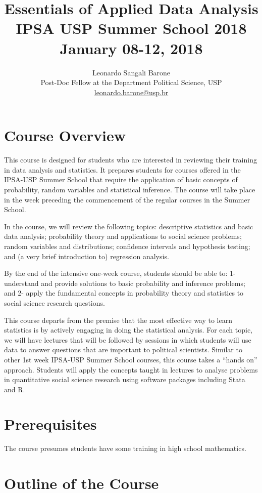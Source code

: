 \documentclass[a4paper,11pt]{article}
\title{Essentials of Applied Data Analysis\\ \large  IPSA USP Summer School 2018\\ January 08-12, 2018}
\author{Leonardo Sangali Barone\\Post-Doc Fellow at the Department Political Science, USP\\ \href{mailto:leonardo.barone@usp.br}{leonardo.barone@usp.br}}
\date{}
\begin{document}
  \maketitle 
    \tableofcontents
  \pagebreak


\section{Course Overview}

This course is designed for students who are interested in reviewing their training in data analysis and statistics. It prepares students for courses offered in the IPSA-USP Summer School that require the application of basic concepts of probability, random variables and statistical inference. The course will take place in the week preceding the commencement of the regular courses in the Summer School.

In the course, we will review the following topics: descriptive statistics and basic data analysis; probability theory and applications to social science problems; random variables and distributions; confidence intervals and hypothesis testing; and (a very brief introduction to) regression analysis.

By the end of the intensive one-week course, students should be able to: 1- understand and provide solutions to basic probability and inference problems; and 2- apply the fundamental concepts in probability theory and statistics to social science research questions.

This course departs from the premise that the most effective way to learn statistics is by actively engaging in doing the statistical analysis. For each topic, we will have lectures that will be followed by sessions in which students will use data to answer questions that are important to political scientists. Similar to other 1st week IPSA-USP Summer School courses, this course takes a ``hands on'' approach. Students will apply the concepts taught in lectures to analyse problems in quantitative social science research using software packages including Stata and R.   

\section{Prerequisites}

The course presumes students have some training in high school mathematics.

\section{Outline of the Course}
\end{document}
